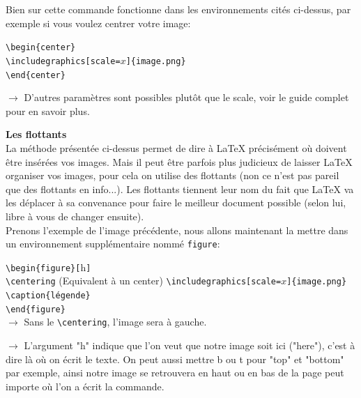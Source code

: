 \documentclass[11pt]{article}				%
\newcommand{\tb}{\textbackslash}
\newcommand{\cmdo}[3][]{\texttt{\textbackslash #2}\texttt{[#1}\texttt{]\{#3\}}}
\newcommand{\cmd}[2]{\texttt{\textbackslash #1}\texttt{\{#2\}}}
\begin{document}
Bien sur cette commande fonctionne dans les environnements cités ci-dessus, par exemple si vous voulez centrer votre image: \\


\begin{multicols}{2}
\cmd{begin}{center}\\
\cmdo[scale=$x$]{includegraphics}{image.png} \\
\cmd{end}{center}\\

\columnbreak

$\rightarrow$ D'autres paramètres sont possibles plutôt que le scale, voir le guide complet pour en savoir plus.
\end{multicols}


\textbf{Les flottants}\\

La méthode présentée ci-dessus permet de dire à LaTeX précisément où doivent être insérées vos images. Mais il peut être parfois plus judicieux de laisser LaTeX organiser vos images, pour cela on utilise des flottants (non ce n'est pas pareil que des flottants en info...). Les flottants tiennent leur nom du fait que LaTeX va les déplacer à sa convenance pour faire le meilleur document possible (selon lui, libre à vous de changer ensuite).\\



Prenons l'exemple de l'image précédente, nous allons maintenant la mettre dans un environnement supplémentaire nommé \texttt{figure}: \\

\begin{multicols}{2}
\cmd{begin}{figure}\texttt{[}h\texttt{]}\\
\texttt{\tb centering} \quad (Equivalent à un center)
\cmdo[scale=$x$]{includegraphics}{image.png} \\
\cmd{caption}{légende}\\
\cmd{end}{figure}\\
$\rightarrow$ Sans le \texttt{\tb centering}, l'image sera à gauche. 

\columnbreak

$\rightarrow$ L'argument "h" indique que l'on veut que notre image soit ici ("here"), c'est à dire là où on écrit le texte. On peut aussi mettre b ou t pour "top" et "bottom" par exemple, ainsi notre image se retrouvera en haut ou en bas de la page peut importe où l'on a écrit la commande.
\end{multicols}
\end{document}
